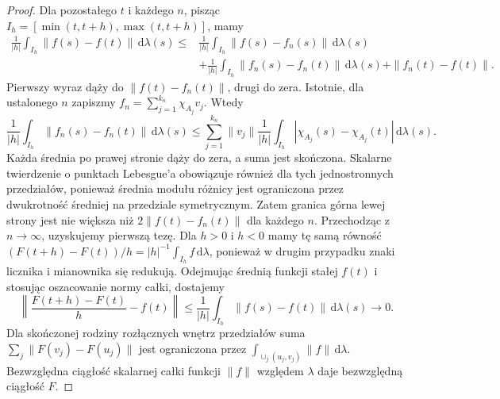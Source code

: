 \begin{proof}
Dla pozostałego $t$ i każdego $n$, pisząc
$I_h=[\min(t,t+h),\max(t,t+h)]$, mamy
\[
 \begin{split}
 \frac1{|h|}\int_{I_h}\|f(s)-f(t)\|\,\mathrm d\lambda(s)
 \le{}&\frac1{|h|}\int_{I_h}\|f(s)-f_n(s)\|\,\mathrm d\lambda(s)\\
 &+\frac1{|h|}\int_{I_h}\|f_n(s)-f_n(t)\|\,\mathrm d\lambda(s)
 +\|f_n(t)-f(t)\|.
 \end{split}
\]
Pierwszy wyraz dąży do $\|f(t)-f_n(t)\|$, drugi do
zera. Istotnie, dla ustalonego $n$ zapiszmy
$f_n=\sum_{j=1}^{k_n}\chi_{A_j}v_j$. Wtedy
\[
 \frac1{|h|}\int_{I_h}\|f_n(s)-f_n(t)\|\,\mathrm d\lambda(s)
 \le\sum_{j=1}^{k_n}\|v_j\|
 \frac1{|h|}\int_{I_h}|\chi_{A_j}(s)-\chi_{A_j}(t)|\,\mathrm d\lambda(s).
\]
Każda średnia po prawej stronie dąży do zera,
a suma jest skończona.
Skalarne twierdzenie o punktach Lebesgue'a obowiązuje
również dla tych jednostronnych przedziałów, ponieważ
średnia modułu różnicy jest ograniczona przez
dwukrotność średniej na przedziale symetrycznym.
Zatem granica górna lewej strony jest nie większa
niż $2\|f(t)-f_n(t)\|$ dla każdego $n$. Przechodząc
z $n\to\infty$, uzyskujemy pierwszą tezę.
Dla $h>0$ i $h<0$ mamy tę samą równość
$(F(t+h)-F(t))/h=|h|^{-1}\int_{I_h}f\,\mathrm d\lambda$,
ponieważ w drugim przypadku znaki licznika i mianownika
się redukują. Odejmując średnią funkcji stałej $f(t)$
i stosując oszacowanie normy całki, dostajemy
\[
 \left\|\frac{F(t+h)-F(t)}h-f(t)\right\|
 \le \frac1{|h|}\int_{I_h}\|f(s)-f(t)\|\,\mathrm d\lambda(s)
 \longrightarrow0.
\]
Dla skończonej rodziny rozłącznych wnętrz przedziałów
suma $\sum_j\|F(v_j)-F(u_j)\|$ jest ograniczona przez
$\int_{\cup_j(u_j,v_j)}\|f\|\,\mathrm d\lambda$.
Bezwzględna ciągłość skalarnej całki funkcji $\|f\|$
względem $\lambda$ daje bezwzględną ciągłość $F$.
\end{proof}

